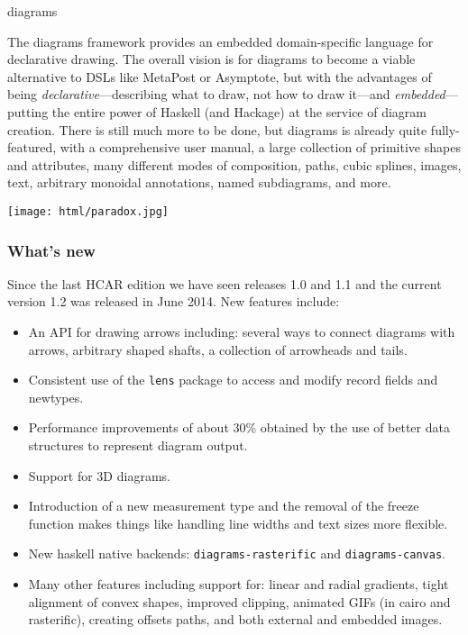 \begin{hcarentry}[updated]{diagrams}

\makeheader

The diagrams framework provides an embedded domain-specific language
for declarative drawing.  The overall vision is for diagrams to become
a viable alternative to DSLs like MetaPost or Asymptote, but with the
advantages of being \emph{declarative}---describing what to draw, not
how to draw it---and \emph{embedded}---putting the entire power of
Haskell (and Hackage) at the service of diagram creation.  There is
still much more to be done, but diagrams is already quite
fully-featured, with a comprehensive user manual, a large collection
of primitive shapes and attributes, many different modes of
composition, paths, cubic splines, images, text, arbitrary monoidal
annotations, named subdiagrams, and more.

\begin{center}
\texttt{[image: html/paradox.jpg]}
\end{center}

\subsubsection*{What's new}

Since the last HCAR edition we have seen releases 1.0 and 1.1 and 
the current version 1.2 was released in June 2014.
New features include:
\begin{itemize}
\item An API for drawing arrows including: several ways to connect diagrams
  with arrows, arbitrary shaped shafts, a collection of arrowheads and tails.
\item Consistent use of the \texttt{lens} package to access and modify 
  record fields and newtypes.
\item Performance improvements of about 30\% obtained by the use
  of better data structures to represent diagram output.
\item Support for 3D diagrams.
\item Introduction of a new measurement type and the removal of the
  freeze function makes things like handling line widths and text sizes
   more flexible.
\item New haskell native backends: \texttt{diagrams-rasterific} and
  \texttt{diagrams-canvas}. 
\item Many other features including support for: linear and radial gradients, tight alignment of convex
  shapes, improved clipping, animated GIFs (in cairo and rasterific), creating offsets paths,
  and both external and embedded images.
\end{itemize}



\end{hcarentry}
